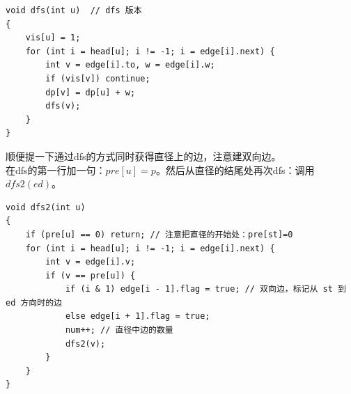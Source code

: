 \begin{lstlisting}
void dfs(int u)  // dfs 版本
{
	vis[u] = 1;
	for (int i = head[u]; i != -1; i = edge[i].next) {
		int v = edge[i].to, w = edge[i].w;
		if (vis[v]) continue;
		dp[v] = dp[u] + w;
		dfs(v);
	}
}
\end{lstlisting}

顺便提一下通过dfs的方式同时获得直径上的边，注意建双向边。\\
在dfs的第一行加一句：$pre[u]=p$。然后从直径的结尾处再次dfs：调用$dfs2(ed)$。
\begin{lstlisting}
void dfs2(int u)
{
    if (pre[u] == 0) return; // 注意把直径的开始处：pre[st]=0
    for (int i = head[u]; i != -1; i = edge[i].next) {
        int v = edge[i].v;
        if (v == pre[u]) {
            if (i & 1) edge[i - 1].flag = true; // 双向边，标记从 st 到 ed 方向时的边
            else edge[i + 1].flag = true;
            num++; // 直径中边的数量
            dfs2(v);
        }
    }
}
\end{lstlisting}

